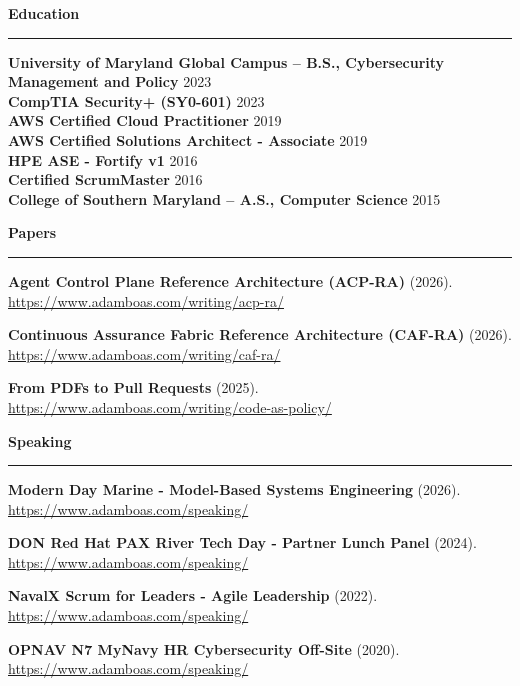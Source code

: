 \documentclass[10pt]{article}
\newcommand{\ResumeSection}[1]{\vspace{0.16em}\noindent\textbf{\large #1}\par\nointerlineskip\textcolor{accentgold}{\rule{\textwidth}{0.75pt}}\vspace{0.01em}}
\newcommand{\LinkedEntry}[3]{{\scriptsize\textbf{#1} (#2). \href{#3}{#3}}\par}
\begin{document}
\ResumeSection{Education}
{\setlength{\parskip}{0.06em}
\textbf{University of Maryland Global Campus -- B.S., Cybersecurity Management and Policy} \hfill 2023\\
\textbf{CompTIA Security+ (SY0-601)} \hfill 2023\\
\textbf{AWS Certified Cloud Practitioner} \hfill 2019\\
\textbf{AWS Certified Solutions Architect - Associate} \hfill 2019\\
\textbf{HPE ASE - Fortify v1} \hfill 2016\\
\textbf{Certified ScrumMaster} \hfill 2016\\
\textbf{College of Southern Maryland -- A.S., Computer Science} \hfill 2015\\
}

\ResumeSection{Papers}
{\footnotesize\setlength{\parskip}{0.00em}
\LinkedEntry{Agent Control Plane Reference Architecture (ACP-RA)}{2026}{https://www.adamboas.com/writing/acp-ra/}
\LinkedEntry{Continuous Assurance Fabric Reference Architecture (CAF-RA)}{2026}{https://www.adamboas.com/writing/caf-ra/}
\LinkedEntry{From PDFs to Pull Requests}{2025}{https://www.adamboas.com/writing/code-as-policy/}
}

\ResumeSection{Speaking}
{\footnotesize\setlength{\parskip}{0.00em}
\LinkedEntry{Modern Day Marine - Model-Based Systems Engineering}{2026}{https://www.adamboas.com/speaking/}
\LinkedEntry{DON Red Hat PAX River Tech Day - Partner Lunch Panel}{2024}{https://www.adamboas.com/speaking/}
\LinkedEntry{NavalX Scrum for Leaders - Agile Leadership}{2022}{https://www.adamboas.com/speaking/}
\LinkedEntry{OPNAV N7 MyNavy HR Cybersecurity Off-Site}{2020}{https://www.adamboas.com/speaking/}
}
\end{document}
